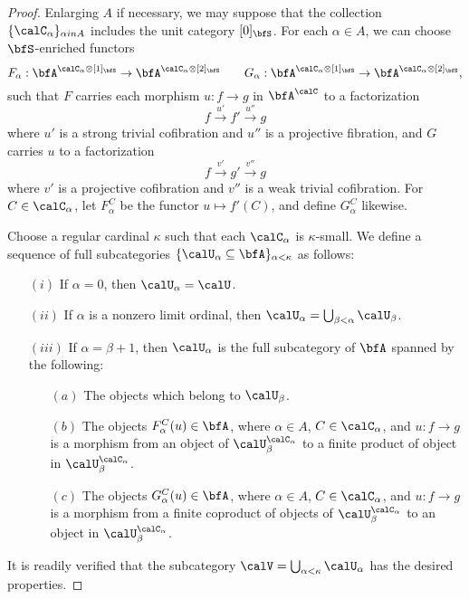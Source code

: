 \begin{proof}
Enlarging $A$ if necessary, we may suppose that the collection $\{ \calC_{\alpha} \}_{\alpha in A}$
includes the unit category $[0]_{\bfS}$. 
For each $\alpha \in A$, we can choose
$\bfS$-enriched functors $$F_{\alpha}: \bfA^{ \calC_{\alpha} \otimes [1]_{\bfS} } \rightarrow
\bfA^{ \calC_{\alpha} \otimes [2]_{\bfS} } \quad \quad
G_{\alpha}: \bfA^{ \calC_{\alpha} \otimes [1]_{\bfS} } \rightarrow
\bfA^{ \calC_{\alpha} \otimes [2]_{\bfS} },$$
such that $F$ carries each morphism $u: f \rightarrow g$ in $\bfA^{\calC}$ to a factorization
$$ f \stackrel{u'}{\rightarrow} f' \stackrel{u''}{\rightarrow} g$$
where $u'$ is a strong trivial cofibration and $u''$ is a projective fibration, and
$G$ carries $u$ to a factorization
$$ f \stackrel{v'}{\rightarrow} g' \stackrel{v''}{\rightarrow} g$$
where $v'$ is a projective cofibration and $v''$ is a weak trivial cofibration.
For $C \in \calC_{\alpha}$, let $F^{C}_{\alpha}$ be the
functor $u \mapsto f'(C)$, and define $G^{C}_{\alpha}$ likewise.

Choose a regular cardinal $\kappa$ such that each $\calC_{\alpha}$ is 
$\kappa$-small. We define a sequence of full subcategories
$\{ \calU_{\alpha} \subseteq \bfA \}_{ \alpha < \kappa }$ as follows:
\begin{itemize}
\item[$(i)$] If $\alpha = 0$, then $\calU_{\alpha} = \calU$.
\item[$(ii)$] If $\alpha$ is a nonzero limit ordinal, then 
$\calU_{\alpha} = \bigcup_{\beta < \alpha} \calU_{\beta}$.
\item[$(iii)$] If $\alpha = \beta + 1$, then
$\calU_{\alpha}$ is the full subcategory of $\bfA$ spanned by the following:
\begin{itemize}
\item[$(a)$] The objects which belong to $\calU_{\beta}$.
\item[$(b)$] The objects $F^{C}_{\alpha}(u) \in \bfA$, where
$\alpha \in A$, $C \in \calC_{\alpha}$, and $u: f \rightarrow g$
is a morphism from an object of $\calU_{\beta}^{\calC_{\alpha}}$ to
a finite product of object in $\calU_{\beta}^{\calC_{\alpha}}$. 
\item[$(c)$] The objects $G^{C}_{\alpha}(u) \in \bfA$, where
$\alpha \in A$, $C \in \calC_{\alpha}$, and $u: f \rightarrow g$
is a morphism from a finite coproduct of objects of $\calU_{\beta}^{\calC_{\alpha}}$ to
an object in $\calU_{\beta}^{\calC_{\alpha}}$. 
\end{itemize}
\end{itemize}

It is readily verified that the subcategory $\calV = \bigcup_{\alpha < \kappa} \calU_{\alpha}$
has the desired properties.
\end{proof}

